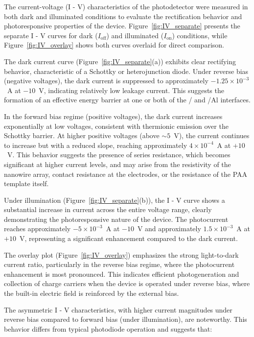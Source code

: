 \documentclass{rapportCS}
\begin{document}
	The current-voltage (I - V) characteristics of the photodetector were measured in both dark and illuminated conditions to evaluate the rectification behavior and photoresponsive properties of the device. Figure~\ref{fig:IV_separate} presents the separate I - V curves for dark ($I_{\text{off}}$) and illuminated ($I_{\text{on}}$) conditions, while Figure~\ref{fig:IV_overlay} shows both curves overlaid for direct comparison.
	
	The dark current curve (Figure~\ref{fig:IV_separate}(a)) exhibits clear rectifying behavior, characteristic of a Schottky or heterojunction diode. Under reverse bias (negative voltages), the dark current is suppressed to approximately $-1.25 \times 10^{-3}$~A at $-10$~V, indicating relatively low leakage current. This suggests the formation of an effective energy barrier at one or both of the / and /Al interfaces.
	
	In the forward bias regime (positive voltages), the dark current increases exponentially at low voltages, consistent with thermionic emission over the Schottky barrier. At higher positive voltages (above $\sim 5$~V), the current continues to increase but with a reduced slope, reaching approximately $4 \times 10^{-4}$~A at $+10$~V. This behavior suggests the presence of series resistance, which becomes significant at higher current levels, and may arise from the resistivity of the nanowire array, contact resistance at the electrodes, or the resistance of the PAA template itself.
	
	Under illumination (Figure~\ref{fig:IV_separate}(b)), the I - V curve shows a substantial increase in current across the entire voltage range, clearly demonstrating the photoresponsive nature of the device. The photocurrent reaches approximately $-5 \times 10^{-3}$~A at $-10$~V and approximately $1.5 \times 10^{-3}$~A at $+10$~V, representing a significant enhancement compared to the dark current.
	
	The overlay plot (Figure~\ref{fig:IV_overlay}) emphasizes the strong light-to-dark current ratio, particularly in the reverse bias regime, where the photocurrent enhancement is most pronounced. This indicates efficient photogeneration and collection of charge carriers when the device is operated under reverse bias, where the built-in electric field is reinforced by the external bias.
	
	The asymmetric I - V characteristics, with higher current magnitudes under reverse bias compared to forward bias (under illumination), are noteworthy. This behavior differs from typical photodiode operation and suggests that:
	
\end{document}
